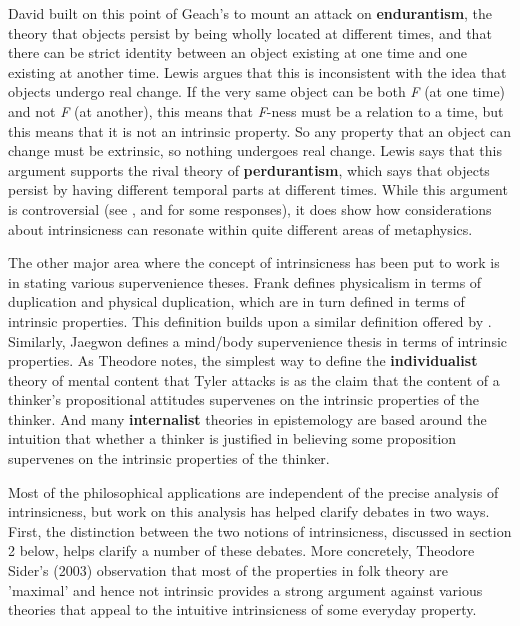David \citet{Lewis1986a, Lewis1988c} built on this point of Geach's to mount an attack on \textbf{endurantism}, the theory that objects persist by being wholly located at different times, and that there can be strict identity between an object existing at one time and one existing at another time. Lewis argues that this is inconsistent with the idea that objects undergo real change. If the very same object can be both \textit{F} (at one time) and not \textit{F} (at another), this means that \textit{F}{}-ness must be a relation to a time, but this means that it is not an intrinsic property. So any property that an object can change must be extrinsic, so nothing undergoes real change. Lewis says that this argument supports the rival theory of \textbf{perdurantism}, which says that objects persist by having different temporal parts at different times. While this argument is controversial (see \citet{Haslanger1989}, \citet{Johnston1987} and \citet{Lowe1988} for some responses), it does show how considerations about intrinsicness can resonate within quite different areas of metaphysics.

The other major area where the concept of intrinsicness has been put to work is in stating various supervenience theses. Frank \citet{Jackson1998} defines physicalism in terms of duplication and physical duplication, which are in turn defined in terms of intrinsic properties. This definition builds upon a similar definition offered by \citet{Lewis1983e}. Similarly, Jaegwon \citet{Kim1982} defines a mind/body supervenience thesis in terms of intrinsic properties. As Theodore \citet{Sider1993-SIDAAS} notes, the simplest way to define the \textbf{individualist} theory of mental content that Tyler \citet{Burge1979} attacks is as the claim that the content of a thinker's propositional attitudes supervenes on the intrinsic properties of the thinker. And many \textbf{internalist} theories in epistemology are based around the intuition that whether a thinker is justified in believing some proposition supervenes on the intrinsic properties of the thinker.

Most of the philosophical applications are independent of the precise analysis of intrinsicness, but work on this analysis has helped clarify debates in two ways. First, the distinction between the two notions of intrinsicness, discussed in section 2 below, helps clarify a number of these debates. More concretely, Theodore Sider's (2003) observation that most of the properties in folk theory are 'maximal' and hence not intrinsic provides a strong argument against various theories that appeal to the intuitive intrinsicness of some everyday property.

